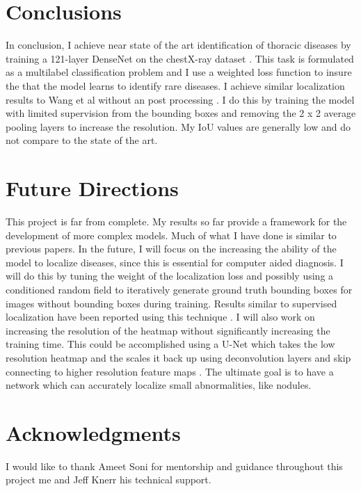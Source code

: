 \documentclass{article}
\begin{document}
\section{Conclusions}

In conclusion, I achieve near state of the art identification of thoracic diseases by training a 121-layer DenseNet on the chestX-ray dataset \cite{Rajpurkar}. This task is formulated as a multilabel classification problem and I use a weighted loss function to insure the that the model learns to identify rare diseases. I achieve similar localization results to Wang et al without an post processing \cite{Wang}. I do this by training the model with limited supervision from the bounding boxes and removing the 2 x 2 average pooling layers to increase the resolution. My IoU values are generally low and do not compare to the state of the art.

\section{Future Directions}

This project is far from complete. My results so far provide a framework for the development of more complex models. Much of what I have done is similar to previous papers. In the future, I will focus on the increasing the ability of the model to localize diseases, since this is essential for computer aided diagnosis. I will do this by tuning the weight of the localization loss and possibly using a conditioned random field to iteratively generate ground truth bounding boxes for images without bounding boxes during training. Results similar to supervised localization have been reported using this technique \cite{Li2}. I will also work on increasing the resolution of the heatmap without significantly increasing the training time. This could be accomplished using a U-Net which takes the low resolution heatmap and the scales it back up using deconvolution layers and skip connecting to higher resolution feature maps \cite{Ronneberger}. The ultimate goal is to have a network which can accurately localize small abnormalities, like nodules.

\section*{Acknowledgments}

I would like to thank Ameet Soni for mentorship and guidance throughout this project me and Jeff Knerr his technical support.




\end{document}
